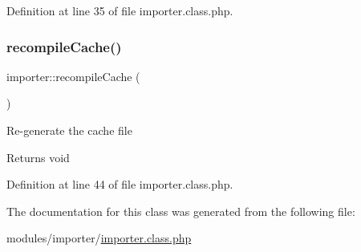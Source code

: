 Definition at line 35 of file importer.\+class.\+php.

\hypertarget{classimporter_a14049d84d0d3bb175857fc6e34447954}{}\label{classimporter_a14049d84d0d3bb175857fc6e34447954} 
\subsubsection{\texorpdfstring{recompile\+Cache()}{recompileCache()}}
{\footnotesize\ttfamily importer\+::recompile\+Cache (\begin{DoxyParamCaption}{ }\end{DoxyParamCaption})}

Re-\/generate the cache file \begin{DoxyReturn}{Returns}
void 
\end{DoxyReturn}


Definition at line 44 of file importer.\+class.\+php.



The documentation for this class was generated from the following file\+:\begin{DoxyCompactItemize}
\item 
modules/importer/\hyperlink{importer_8class_8php}{importer.\+class.\+php}\end{DoxyCompactItemize}
